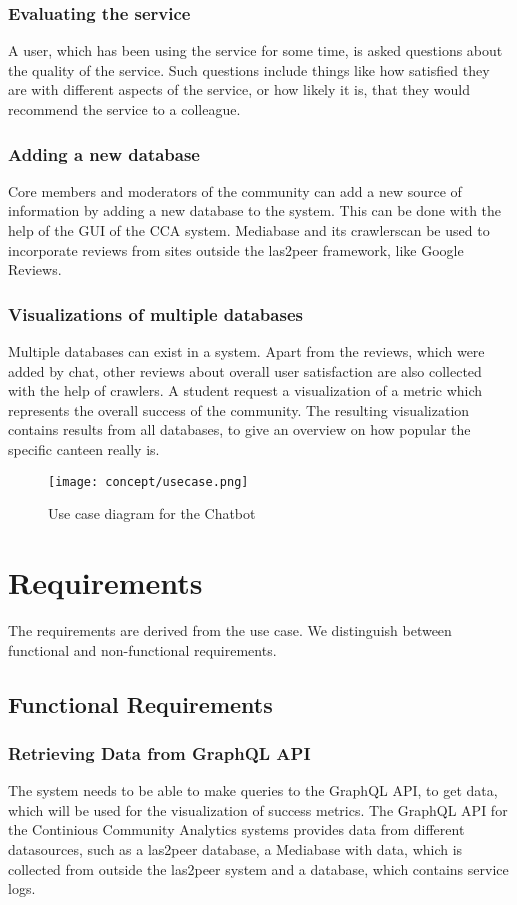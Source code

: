 \subsubsection{Evaluating the service} A user, which has been using the service for some time, is asked questions about the quality of the service. Such questions include things like how satisfied they are with different aspects of the service, or how likely it is, that they would recommend the service to a colleague.

\subsubsection{Adding a new database} Core members and moderators of the community can add a new source of information by adding a new database to the system. This can be done with the help of the GUI of the CCA system. Mediabase and its crawlerscan be used to incorporate reviews from sites outside the las2peer framework, like Google Reviews.

\subsubsection{Visualizations of multiple databases} Multiple databases can exist in a system. Apart from the reviews, which were added by chat, other reviews about overall user satisfaction are also collected with the help of crawlers. A student request a visualization of a metric which represents the overall success of the community. The resulting visualization contains results from all databases, to give an overview on how popular the specific canteen really is.

\begin{figure}
    \centering
    \texttt{[image: concept/usecase.png]}
    \caption{Use case diagram for the Chatbot}
\end{figure}

\section{Requirements}
The requirements are derived from the use case. We distinguish between functional and non-functional requirements.
\subsection{Functional Requirements}

\subsubsection{Retrieving Data from GraphQL API}
The system needs to be able to make queries to the GraphQL API, to get data, which will be used for the visualization of success metrics. The GraphQL API  for the Continious Community Analytics systems provides data from different datasources, such as a las2peer database, a Mediabase with data, which is collected from outside the las2peer system and a database, which contains service logs.

